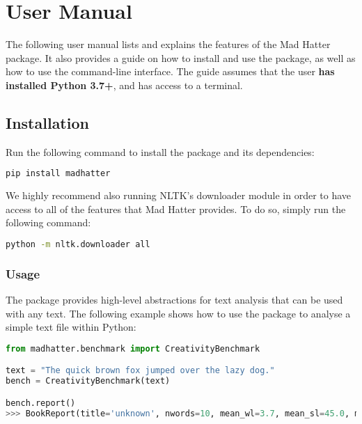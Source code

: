 \chapter{User Manual}
The following user manual lists and explains the features of the Mad Hatter package. It also provides a guide on how to install and use the package, as well as how to use the command-line interface. The guide assumes that the user \textbf{has installed Python 3.7+}, and has access to a terminal.

\section{Installation}

Run the following command to install the package and its dependencies:

\begin{lstlisting}[language=bash]
    pip install madhatter
\end{lstlisting}

We highly recommend also running NLTK's downloader module in order to have access to all of the features that Mad Hatter provides. To do so, simply run the following command:

\begin{lstlisting}[language=bash]
    python -m nltk.downloader all
\end{lstlisting}


\subsection{Usage}

The package provides high-level abstractions for text analysis that can be used with any text. The following example shows how to use the package to analyse a simple text file within Python:

\begin{lstlisting}[language=python, breaklines]
from madhatter.benchmark import CreativityBenchmark

text = "The quick brown fox jumped over the lazy dog."
bench = CreativityBenchmark(text)

bench.report()
>>> BookReport(title='unknown', nwords=10, mean_wl=3.7, mean_sl=45.0, mean_tokenspersent=10.0, prop_contentwords=0.1, mean_conc=4.0633333333333335, mean_img=5.359999999999999, mean_freq=-1.6792249660842167, prop_pos={'ADJ': 0.2, 'NOUN': 0.3, 'VERB': 0.1}, surprisal=None, predictability=None)
\end{lstlisting}


